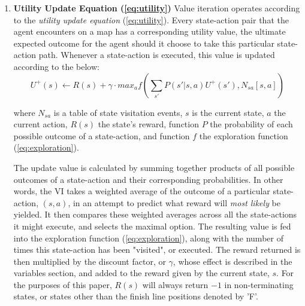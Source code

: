 \documentclass[12pt, letter]{article}
\begin{document}
\begin{enumerate}[rightmargin=.1\linewidth-\leftmargin\relax]
    \item \textbf{Utility Update Equation (\ref{eq:utility})\cite{textbook}}
        Value iteration operates according to the \emph{utility update equation} (\ref{eq:utility}).  Every state-action pair that the agent encounters on a map has a corresponding utility value, the ultimate expected outcome for the agent should it choose to take this particular state-action path.  Whenever a state-action is executed, this value is updated according to the  below:
        \\
        \begin{equation} \label{eq:utility}
            U^+(s)\leftarrow R(s)+\gamma \cdot max_a f(\sum_{s'} P(s'|s,a)U^+(s'), N_{sa}[s,a])
        \end{equation}
        \begin{small} \begin{changemargin}{1cm}{1cm}
        where $N_{sa}$ is a table of state visitation events, $s$ is the current state, $a$ the current action, $R(s)$ the state's reward, function $P$ the probability of each possible outcome of a state-action, and function $f$ the exploration function (\ref{eq:exploration}).
        \end{changemargin} \end{small}
        
        The update value is calculated by summing together products of all possible outcomes of a state-action and their corresponding probabilities.  In other words, the VI takes a weighted average of the outcome of a particular state-action, $(s,a)$, in an attempt to predict what reward will \emph{most likely} be yielded.  It then compares these weighted averages across all the state-actions it might execute, and selects the maximal option.  The resulting value is fed into the exploration function (\ref{eq:exploration}), along with the number of times this state-action has been "visited", or executed.  The reward returned is then multiplied by the discount factor, or $\gamma$, whose effect is described in the variables section, and added to the reward given by the current state, $s$.  For the purposes of this paper, $R(s)$ will always return $-1$ in non-terminating states, or states other than the finish line positions denoted by 'F'.
        

\end{enumerate}
\end{document}
